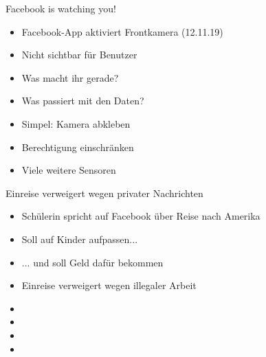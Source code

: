 \documentclass[10pt]{beamer}
\begin{document}
\begin{frame}[fragile]{Facebook is watching you!}
\begin{itemize}
    \item Facebook-App aktiviert Frontkamera (12.11.19)
    \item Nicht sichtbar für Benutzer
    \item Was macht ihr gerade?
    \item Was passiert mit den Daten?
    \item \alert{Simpel: Kamera abkleben}
    \item \alert{Berechtigung einschränken}
    \item \alert{Viele weitere Sensoren}
  \end{itemize}
\end{frame}

\begin{frame}[fragile]{Einreise verweigert wegen privater Nachrichten}
\begin{itemize}
    \item Schülerin spricht auf Facebook über Reise nach Amerika
    \item Soll auf Kinder aufpassen...
    \item ... und soll Geld dafür bekommen
    \item Einreise verweigert wegen illegaler Arbeit
    \item[]
    \item[]
    \item[]
    \item[]
  \end{itemize}
\end{frame}
\end{document}
